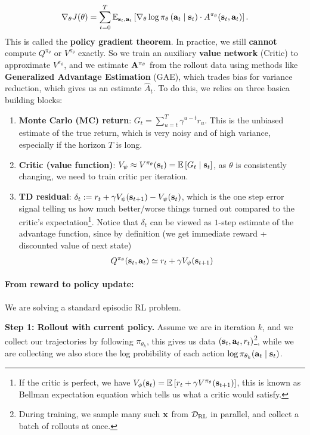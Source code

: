 \documentclass[11pt]{article}  %
\begin{document}
\begin{align*}
  \nabla_{\theta} J(\theta) = \sum_{t=0}^{T}\mathbb{E}_{\mathbf{s}_t, \mathbf{a}_t}\left[\nabla_{\theta}\log \pi_{\theta}\left( \mathbf{a}_t \mid \mathbf{s}_t \right)\cdot A^{\pi_\theta}(\mathbf{s}_t, \mathbf{a}_t)\right].
\end{align*}
This is called the \textbf{policy gradient theorem}.
In practice, we still \textbf{cannot} compute $Q^{\pi_{\theta}}$ or $V^{\pi_\theta}$ exactly.
So we train an auxiliary \textbf{value network} (Critic) to approximate $V^{\pi_\theta}$, and we estimate $\mathbf{A}^{\pi_\theta}$ from the rollout data using methods like \textbf{Generalized Advantage Estimation} (GAE), which trades bias for variance reduction, which gives us an estimate $\hat{A}_t$.
To do this, we relies on three basica building blocks:
\begin{enumerate}
  \item \textbf{Monte Carlo (MC) return}: $G_t = \sum_{u=t}^{T}\gamma^{u - t}r_u$. 
  This is the unbiased estimate of the true return, which is very noisy and of high variance, especially if the horizon $T$ is long.

  \item \textbf{Critic (value function)}: $V_\psi \approx V^{\pi_\theta}(\mathbf{s}_t) = \mathbb{E}\left[G_t \mid \mathbf{s}_t\right]$, as $\theta$ is consistently changing, we need to train critic per iteration. 
  
  \item \textbf{TD residual}: $\delta_t := r_t + \gamma V_{\psi}(\mathbf{s}_{t+1}) - V_\psi(\mathbf{s}_t)$, which is the one step error signal telling us how much better/worse things turned out compared to the critic's expectation\footnote{If the critic is perfect, we have $V_{\phi}(\mathbf{s}_t) = \mathbb{E}\left[r_t + \gamma V^{\pi_\theta}(\mathbf{s}_{t+1})\right]$, this is known as Bellman expectation equation which tells us what a critic would satisfy.}.
  Notice that $\delta_t$ can be viewed as $1$-step estimate of the advantage function, since by definition (we get immediate reward + discounted value of next state)
  \begin{align*}
    Q^{\pi_\theta}(\mathbf{s}_t, \mathbf{a}_t) \simeq r_t + \gamma V_{\psi}(\mathbf{s}_{t+1})
  \end{align*}
\end{enumerate}

\paragraph{From reward to policy update:}
We are solving a standard episodic RL problem.

\textbf{Step 1: Rollout with current policy.} 
Assume we are in iteration $k$, and we collect our trajectories by following $\pi_{\theta_k}$, this gives us data $\left( \mathbf{s}_t, \mathbf{a}_t, r_t \right)$\footnote{During training, we sample many such $\mathbf{x}$ from $\mathcal{D}_{\text{RL}}$ in parallel, and collect a batch of rollouts at once.},
while we are collecting we also store the log probibility of each action $\log \pi_{\theta_k}(\mathbf{a}_t \mid \mathbf{s}_t)$.
\end{document}
